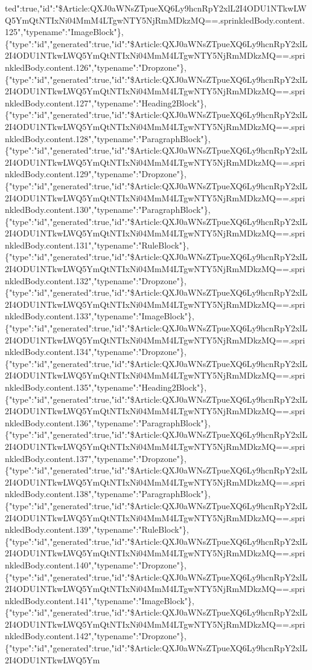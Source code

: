 ted":true,"id":"\$Article:QXJ0aWNsZTpueXQ6Ly9hcnRpY2xlL2I4ODU1NTkwLWQ5YmQtNTIxNi04MmM4LTgwNTY5NjRmMDkzMQ==.sprinkledBody.content.125","typename":"ImageBlock"\},\{"type":"id","generated":true,"id":"\$Article:QXJ0aWNsZTpueXQ6Ly9hcnRpY2xlL2I4ODU1NTkwLWQ5YmQtNTIxNi04MmM4LTgwNTY5NjRmMDkzMQ==.sprinkledBody.content.126","typename":"Dropzone"\},\{"type":"id","generated":true,"id":"\$Article:QXJ0aWNsZTpueXQ6Ly9hcnRpY2xlL2I4ODU1NTkwLWQ5YmQtNTIxNi04MmM4LTgwNTY5NjRmMDkzMQ==.sprinkledBody.content.127","typename":"Heading2Block"\},\{"type":"id","generated":true,"id":"\$Article:QXJ0aWNsZTpueXQ6Ly9hcnRpY2xlL2I4ODU1NTkwLWQ5YmQtNTIxNi04MmM4LTgwNTY5NjRmMDkzMQ==.sprinkledBody.content.128","typename":"ParagraphBlock"\},\{"type":"id","generated":true,"id":"\$Article:QXJ0aWNsZTpueXQ6Ly9hcnRpY2xlL2I4ODU1NTkwLWQ5YmQtNTIxNi04MmM4LTgwNTY5NjRmMDkzMQ==.sprinkledBody.content.129","typename":"Dropzone"\},\{"type":"id","generated":true,"id":"\$Article:QXJ0aWNsZTpueXQ6Ly9hcnRpY2xlL2I4ODU1NTkwLWQ5YmQtNTIxNi04MmM4LTgwNTY5NjRmMDkzMQ==.sprinkledBody.content.130","typename":"ParagraphBlock"\},\{"type":"id","generated":true,"id":"\$Article:QXJ0aWNsZTpueXQ6Ly9hcnRpY2xlL2I4ODU1NTkwLWQ5YmQtNTIxNi04MmM4LTgwNTY5NjRmMDkzMQ==.sprinkledBody.content.131","typename":"RuleBlock"\},\{"type":"id","generated":true,"id":"\$Article:QXJ0aWNsZTpueXQ6Ly9hcnRpY2xlL2I4ODU1NTkwLWQ5YmQtNTIxNi04MmM4LTgwNTY5NjRmMDkzMQ==.sprinkledBody.content.132","typename":"Dropzone"\},\{"type":"id","generated":true,"id":"\$Article:QXJ0aWNsZTpueXQ6Ly9hcnRpY2xlL2I4ODU1NTkwLWQ5YmQtNTIxNi04MmM4LTgwNTY5NjRmMDkzMQ==.sprinkledBody.content.133","typename":"ImageBlock"\},\{"type":"id","generated":true,"id":"\$Article:QXJ0aWNsZTpueXQ6Ly9hcnRpY2xlL2I4ODU1NTkwLWQ5YmQtNTIxNi04MmM4LTgwNTY5NjRmMDkzMQ==.sprinkledBody.content.134","typename":"Dropzone"\},\{"type":"id","generated":true,"id":"\$Article:QXJ0aWNsZTpueXQ6Ly9hcnRpY2xlL2I4ODU1NTkwLWQ5YmQtNTIxNi04MmM4LTgwNTY5NjRmMDkzMQ==.sprinkledBody.content.135","typename":"Heading2Block"\},\{"type":"id","generated":true,"id":"\$Article:QXJ0aWNsZTpueXQ6Ly9hcnRpY2xlL2I4ODU1NTkwLWQ5YmQtNTIxNi04MmM4LTgwNTY5NjRmMDkzMQ==.sprinkledBody.content.136","typename":"ParagraphBlock"\},\{"type":"id","generated":true,"id":"\$Article:QXJ0aWNsZTpueXQ6Ly9hcnRpY2xlL2I4ODU1NTkwLWQ5YmQtNTIxNi04MmM4LTgwNTY5NjRmMDkzMQ==.sprinkledBody.content.137","typename":"Dropzone"\},\{"type":"id","generated":true,"id":"\$Article:QXJ0aWNsZTpueXQ6Ly9hcnRpY2xlL2I4ODU1NTkwLWQ5YmQtNTIxNi04MmM4LTgwNTY5NjRmMDkzMQ==.sprinkledBody.content.138","typename":"ParagraphBlock"\},\{"type":"id","generated":true,"id":"\$Article:QXJ0aWNsZTpueXQ6Ly9hcnRpY2xlL2I4ODU1NTkwLWQ5YmQtNTIxNi04MmM4LTgwNTY5NjRmMDkzMQ==.sprinkledBody.content.139","typename":"RuleBlock"\},\{"type":"id","generated":true,"id":"\$Article:QXJ0aWNsZTpueXQ6Ly9hcnRpY2xlL2I4ODU1NTkwLWQ5YmQtNTIxNi04MmM4LTgwNTY5NjRmMDkzMQ==.sprinkledBody.content.140","typename":"Dropzone"\},\{"type":"id","generated":true,"id":"\$Article:QXJ0aWNsZTpueXQ6Ly9hcnRpY2xlL2I4ODU1NTkwLWQ5YmQtNTIxNi04MmM4LTgwNTY5NjRmMDkzMQ==.sprinkledBody.content.141","typename":"ImageBlock"\},\{"type":"id","generated":true,"id":"\$Article:QXJ0aWNsZTpueXQ6Ly9hcnRpY2xlL2I4ODU1NTkwLWQ5YmQtNTIxNi04MmM4LTgwNTY5NjRmMDkzMQ==.sprinkledBody.content.142","typename":"Dropzone"\},\{"type":"id","generated":true,"id":"\$Article:QXJ0aWNsZTpueXQ6Ly9hcnRpY2xlL2I4ODU1NTkwLWQ5Ym